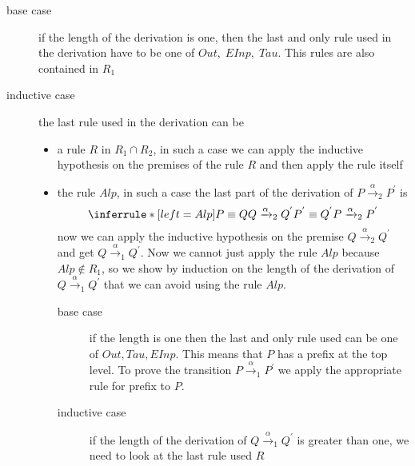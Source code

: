	\begin{description}
	  \item[base case] 
	    if the length of the derivation is one, then the last and only rule used in the derivation have to be one of $Out,\; EInp,\; Tau$. This rules are also contained in $R_{1}$
	  \item[inductive case]
	    the last rule used in the derivation can be
	    \begin{itemize}
	      \item
		a rule $R$ in $R_{1}\cap R_{2}$, in such a case we can apply the inductive hypothesis on the premises of the rule $R$ and then apply the rule itself 
	      \item
		the rule $Alp$, in such a case the last part of the derivation of $P\xrightarrow{\alpha}_{2}P^{'}$ is
		\[
		  \inferrule* [left=Alp]{
		      P\equiv Q
		    \\
		      Q\xrightarrow{\alpha}_{2}Q^{'}
		    \\
		      P^{'}\equiv Q^{'}
		  }{
		    P\xrightarrow{\alpha}_{2}P^{'}
		  }
		\]
		now we can apply the inductive hypothesis on the premise $Q\xrightarrow{\alpha}_{2}Q^{'}$ and get $Q\xrightarrow{\alpha}_{1}Q^{'}$. Now we cannot just apply the rule $Alp$ because $Alp\notin R_{1}$, so we show by induction on the length of the derivation of $Q\xrightarrow{\alpha}_{1}Q^{'}$ that we can avoid using the rule $Alp$.
		\begin{description}
		  \item[base case] 
		    if the length is one then the last and only rule used can be one of $Out, Tau, EInp$. This means that $P$ has a prefix at the top level. To prove the transition $P\xrightarrow{\alpha}_{1}P^{'}$ we apply the appropriate rule for prefix to $P$.
		  \item[inductive case]
		    if the length of the derivation of $Q\xrightarrow{\alpha}_{1}Q^{'}$ is greater than one, we need to look at the last rule used $R$ 




\end{description}
\end{itemize}
\end{description}
